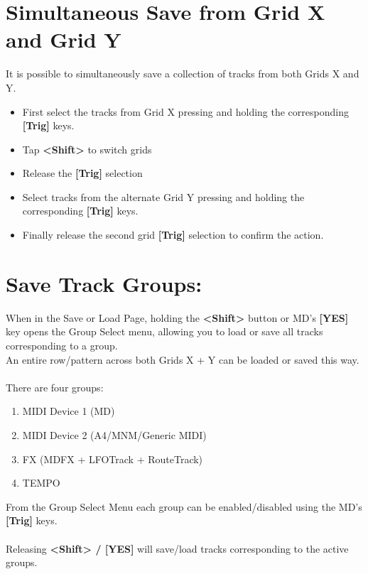 \section{Simultaneous Save from Grid X and Grid Y}
It is possible to simultaneously save a collection of tracks from both Grids X and Y. 
\begin{itemize}
\item First select the tracks from Grid X pressing and holding the corresponding \textbf{[Trig]} keys.
\item Tap \textbf{<Shift>} to switch grids
\item Release the \textbf{[Trig]} selection
\item Select tracks from the alternate Grid Y pressing and holding the corresponding \textbf{[Trig]} keys. 
\item Finally release the second grid \textbf{[Trig]} selection to confirm the action. 
\end{itemize}

\section{Save Track Groups:}
When in the Save or Load Page, holding the \textbf{<Shift>} button or MD's \textbf{[YES]} key opens the Group Select menu,
allowing you to load or save all tracks corresponding to a group.\\An entire row/pattern across both Grids X + Y can be loaded or saved this way.\\
\\
There are four groups:
\begin{enumerate}
    \item MIDI Device 1 (MD)
    \item MIDI Device 2 (A4/MNM/Generic MIDI)
    \item FX (MDFX + LFOTrack + RouteTrack)
    \item TEMPO
\end{enumerate}
From the Group Select Menu each group can be enabled/disabled using the MD's \textbf{[Trig]} keys.\\
\\
Releasing \textbf{<Shift> / [YES]} will save/load tracks corresponding to the active groups.


